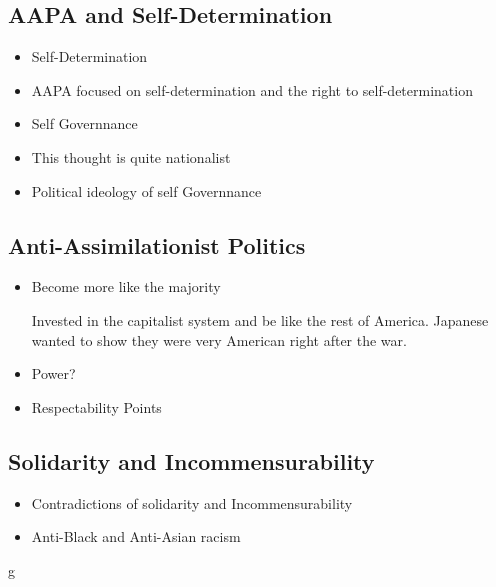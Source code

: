 \documentclass{article}
\begin{document}
\subsection{AAPA and Self-Determination}
\begin{itemize}
  \item Self-Determination
  \item AAPA focused on self-determination and the right to self-determination
  \item Self Governnance
  \item This thought is quite nationalist
  \item Political ideology of self Governnance
\end{itemize}

\subsection{Anti-Assimilationist Politics}
\begin{itemize}
  \item Become more like the majority

    Invested in the capitalist system and be like the rest of America.
    Japanese wanted to show they were very American right after the war.
  \item Power?
    \item Respectability Points
\end{itemize}

\subsection{Solidarity and Incommensurability}
\begin{itemize}
  \item Contradictions of solidarity and Incommensurability
  \item Anti-Black and Anti-Asian racism
\end{itemize}

             g
\end{document}
